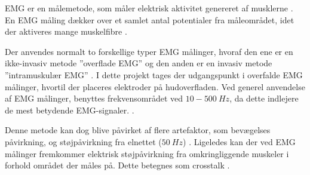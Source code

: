 EMG er en målemetode, som måler elektrisk aktivitet genereret af musklerne \citep{chowdhury2013}. 
En EMG måling dækker over et samlet antal potentialer fra måleområdet, idet der aktiveres mange muskelfibre \citep{keenan2012}. 

Der anvendes normalt to forskellige typer EMG målinger, hvoraf den ene er en ikke-invasiv metode ''overflade EMG'' og den anden er en invasiv metode ''intramuskulær EMG'' \citep{chowdhury2013, keenan2012}.
I dette projekt tages der udgangspunkt i overfalde EMG målinger, hvortil der placeres elektroder på hudoverfladen. 
Ved generel anvendelse af EMG målinger, benyttes frekvensområdet ved $10-500~Hz$, da dette indlejere de mest betydende EMG-signaler. \citep{morre2003, keenan2012}.  

Denne metode kan dog blive påvirket af flere artefaktor, som bevægelses påvirkning, og støjpåvirkning fra elnettet ($50~Hz$) \citep{keenan2012}.
Ligeledes kan der ved EMG målinger fremkommer elektrisk støjpåvirkning fra omkringliggende muskeler i forhold området der måles på. Dette betegnes som crosstalk \citep{keenan2012}. 

